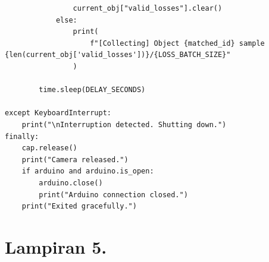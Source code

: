\begin{verbatim}
                current_obj["valid_losses"].clear()
            else:
                print(
                    f"[Collecting] Object {matched_id} sample {len(current_obj['valid_losses'])}/{LOSS_BATCH_SIZE}"
                )

        time.sleep(DELAY_SECONDS)

except KeyboardInterrupt:
    print("\nInterruption detected. Shutting down.")
finally:
    cap.release()
    print("Camera released.")
    if arduino and arduino.is_open:
        arduino.close()
        print("Arduino connection closed.")
    print("Exited gracefully.")
\end{verbatim}

\newpage
\section*{Lampiran 5. }
\label{Lampiran 5}
